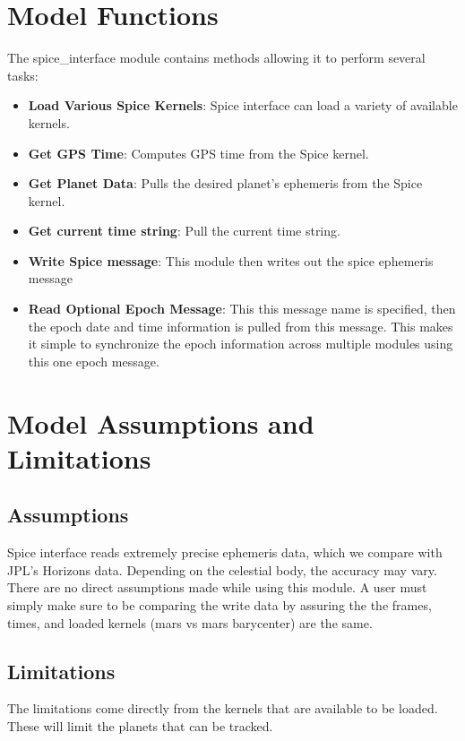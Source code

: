 \section{Model Functions}

The spice\_interface module contains methods allowing it to perform several tasks:

\begin{itemize}
	\item \textbf{Load Various Spice Kernels}: Spice interface can load a variety of available kernels.
	\item \textbf{Get GPS Time}: Computes GPS time from the Spice kernel.
	\item \textbf{Get Planet Data}: Pulls the desired planet's ephemeris from the Spice kernel.
	\item \textbf{Get current time string}: Pull the current time string.
	\item \textbf{Write Spice message}: This module then writes out the spice ephemeris message
	\item \textbf{Read Optional Epoch Message}:  This this message name is specified, then the epoch date and time information is pulled from this message.  This makes it simple to synchronize the epoch information across multiple modules using this one epoch message. 
\end{itemize}


\section{Model Assumptions and Limitations}

\subsection{Assumptions}

Spice interface reads extremely precise ephemeris data, which we compare with JPL's Horizons data. Depending on the celestial body, the accuracy may vary. 
There are no direct assumptions made while using this module. A user must simply make sure to be comparing the write data by assuring the the frames, times, and loaded kernels (mars vs mars barycenter) are the same.

\subsection{Limitations}

The limitations come directly from the kernels that are available to be loaded. These will limit the planets that can be tracked.